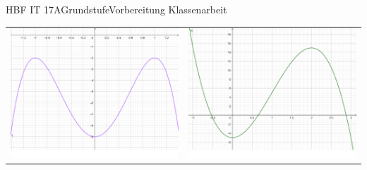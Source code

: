 \documentclass[oneside,openany,headings=optiontotoc,11pt,numbers=noenddot]{scrreprt}
\begin{document}
\begin{worksheet}{HBF IT 17A}{Grundstufe}{Vorbereitung Klassenarbeit}
\begin{framed}
\begin{tabularx}{\textwidth}{X|X}
				\includegraphics[scale=0.25]{Bilder/KAUebungBilder/f0.png} &
				\includegraphics[scale=0.25]{Bilder/KAUebungBilder/m0.png}\\

\end{tabularx}
\end{framed}
\end{worksheet}
\end{document}
